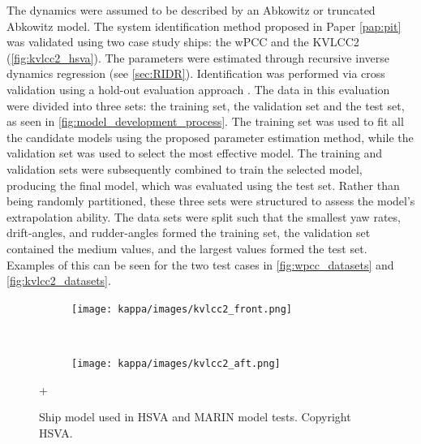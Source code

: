 The dynamics were assumed to be described by an Abkowitz or truncated Abkowitz model. 
The system identification method proposed in Paper \ref{pap:pit} was validated using two case study ships: the wPCC and the KVLCC2 (\autoref{fig:kvlcc2_hsva}). The parameters were estimated through recursive inverse dynamics regression (see \autoref{sec:RIDR}).
Identification was performed via cross validation using a hold-out evaluation approach \cite{sammutHoldoutEvaluation2017}.
The data in this evaluation were divided into three sets: the training set, the validation set and the test set, as seen in \autoref{fig:model_development_process}.
The training set was used to fit all the candidate models using the proposed parameter estimation method, while the validation set was used to select the most effective model. The training and validation sets were subsequently combined to train the selected model, producing the final model, which was evaluated using the test set. Rather than being randomly partitioned, these three sets were structured to assess the model’s extrapolation ability. The data sets were split such that the smallest yaw rates, drift-angles, and rudder-angles formed the training set, the validation set contained the medium values, and the largest values formed the test set.
Examples of this can be seen for the two test cases in \autoref{fig:wpcc_datasets} and \autoref{fig:kvlcc2_datasets}.
\begin{figure}[h!]
    \centering
    \begin{subfigure}[b]{0.45\textwidth}
    \centering
    \texttt{[image: kappa/images/kvlcc2\_front.png]}
    \end{subfigure}
    ~
     \begin{subfigure}[b]{0.45\textwidth}
     \centering
     \texttt{[image: kappa/images/kvlcc2\_aft.png]}
     \end{subfigure}
+    \caption{Ship model used in HSVA and MARIN model tests. Copyright HSVA.}
    \label{fig:kvlcc2_hsva}
\end{figure}
